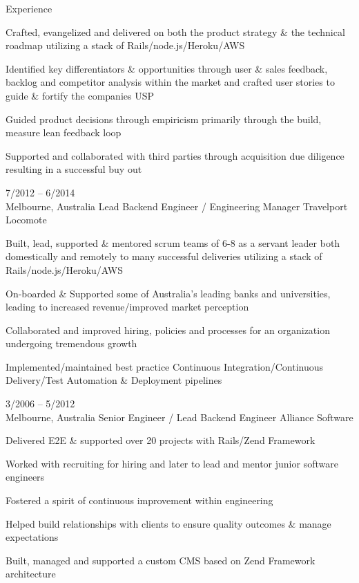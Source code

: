 \documentclass[9pt]{developercv} %
\begin{document}
\begin{cvsect}{Experience}
\begin{entrylist}
{      \par\medskip Crafted, evangelized and delivered on both the product strategy \& the technical roadmap  utilizing a stack of  Rails/node.js/Heroku/AWS
      \par\medskip Identified key differentiators \& opportunities through user \& sales feedback, backlog and competitor analysis within the market and crafted user stories to guide \& fortify the companies USP
      \par\medskip Guided product decisions through empiricism primarily through the build, measure lean feedback loop
      \par\medskip Supported and collaborated with third parties through acquisition due diligence resulting in a successful buy out}
    \entry
      {7/2012 -- 6/2014\\\footnotesize{Melbourne, Australia}}
      {Lead Backend Engineer / Engineering Manager}
      {Travelport Locomote}
      {Built, lead, supported \& mentored scrum teams of 6-8 as a servant leader both domestically and remotely to many successful deliveries utilizing a stack of  Rails/node.js/Heroku/AWS
      \par\medskip On-boarded \& Supported some of Australia's leading banks and universities, leading to increased revenue/improved market perception
      \par\medskip Collaborated and improved hiring, policies and processes for an organization undergoing tremendous growth
      \par\medskip Implemented/maintained best practice Continuous
      Integration/Continuous Delivery/Test Automation \& Deployment pipelines}
    \entry
      {3/2006 -- 5/2012\\\footnotesize{Melbourne, Australia}}
      {Senior Engineer / Lead Backend Engineer}
      {Alliance Software}
      {Delivered E2E \& supported over 20 projects with Rails/Zend Framework
      \par\medskip Worked with recruiting for hiring and later to lead and mentor junior software engineers
      \par\medskip Fostered a spirit of continuous improvement within engineering
      \par\medskip Helped build relationships with clients to ensure quality outcomes \& manage expectations
      \par\medskip Built, managed and supported a custom CMS based on Zend
      Framework architecture}
  \end{entrylist}
\end{cvsect}
\end{document}

